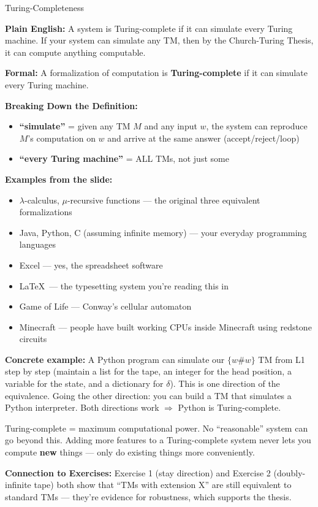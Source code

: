 \documentclass[11pt,a4paper]{article}
\newcommand{\kt}[1]{\par\vspace{0.3em}\colorbox{yellow!60}{\parbox{\dimexpr\linewidth-2\fboxsep}{#1}}\vspace{0.3em}}
\begin{document}
\begin{definitionbox}{Turing-Completeness}

\textbf{Plain English:} A system is Turing-complete if it can simulate every Turing machine. If your system can simulate any TM, then by the Church-Turing Thesis, it can compute anything computable.

\textbf{Formal:} A formalization of computation is \textbf{Turing-complete} if it can simulate every Turing machine.

\textbf{Breaking Down the Definition:}
\begin{itemize}[nosep]
\item \textbf{``simulate''} = given any TM $M$ and any input $w$, the system can reproduce $M$'s computation on $w$ and arrive at the same answer (accept/reject/loop)
\item \textbf{``every Turing machine''} = ALL TMs, not just some
\end{itemize}

\textbf{Examples from the slide:}
\begin{itemize}[nosep]
\item $\lambda$-calculus, $\mu$-recursive functions --- the original three equivalent formalizations
\item Java, Python, C (assuming infinite memory) --- your everyday programming languages
\item Excel --- yes, the spreadsheet software
\item \LaTeX\ --- the typesetting system you're reading this in
\item Game of Life --- Conway's cellular automaton
\item Minecraft --- people have built working CPUs inside Minecraft using redstone circuits
\end{itemize}

\textbf{Concrete example:} A Python program can simulate our $\{w\#w\}$ TM from L1 step by step (maintain a list for the tape, an integer for the head position, a variable for the state, and a dictionary for $\delta$). This is one direction of the equivalence. Going the other direction: you can build a TM that simulates a Python interpreter. Both directions work $\Rightarrow$ Python is Turing-complete.

\kt{Turing-complete = maximum computational power. No ``reasonable'' system can go beyond this. Adding more features to a Turing-complete system never lets you compute \textbf{new} things --- only do existing things more conveniently.}

\textbf{Connection to Exercises:} Exercise 1 (stay direction) and Exercise 2 (doubly-infinite tape) both show that ``TMs with extension X'' are still equivalent to standard TMs --- they're evidence for robustness, which supports the thesis.
\end{definitionbox}
\end{document}
